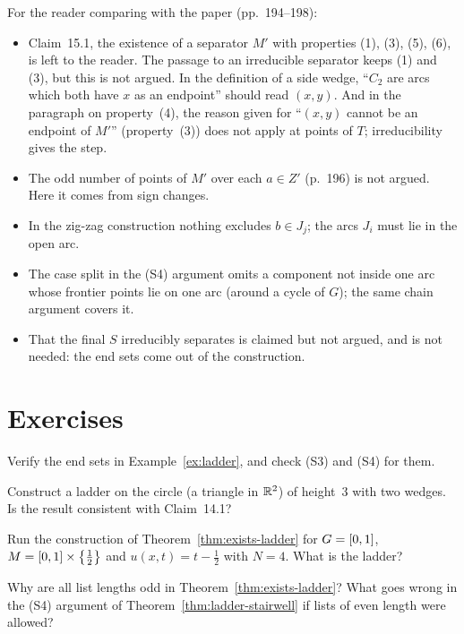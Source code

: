 For the reader comparing with the paper (pp.~194--198):
\begin{itemize}
\item Claim~15.1, the existence of a separator $M'$ with properties (1), (3), (5), (6), is left to the reader. The passage to an irreducible separator keeps (1) and (3), but this is not argued.
In the definition of a side wedge, ``$C_2$ are arcs which both have $x$ as an endpoint'' should read $(x,y)$. And in the paragraph on property~(4), the reason given for ``$(x,y)$ cannot be an
endpoint of $M'$'' (property~(3)) does not apply at points of $T$; irreducibility gives the step.
\item The odd number of points of $M'$ over each $a\in Z'$ (p.~196) is not argued. Here it comes from sign changes.
\item In the zig-zag construction nothing excludes $b\in J_j$; the arcs $J_i$ must lie in the open arc.
\item The case split in the (S4) argument omits a component not inside one arc whose frontier points lie on one arc (around a cycle of $G$); the same chain argument covers it.
\item That the final $S$ irreducibly separates is claimed but not argued, and is not needed: the end sets come out of the construction.
\end{itemize}

\section*{Exercises}

\begin{exercise}
Verify the end sets in Example~\ref{ex:ladder}, and check (S3) and (S4) for them.
\end{exercise}

\begin{exercise}
Construct a ladder on the circle (a triangle in $\mathbb{R}^2$) of height~$3$ with two wedges. Is the result consistent with Claim~14.1?
\end{exercise}

\begin{exercise}
Run the construction of Theorem~\ref{thm:exists-ladder} for $G=[0,1]$, $M=[0,1]\times\left\{ \frac12 \right\}$ and $u(x,t)=t-\frac12$ with $N=4$. What is the ladder?
\end{exercise}

\begin{exercise}
Why are all list lengths odd in Theorem~\ref{thm:exists-ladder}? What goes wrong in the (S4) argument of Theorem~\ref{thm:ladder-stairwell} if lists of even length were allowed?
\end{exercise}
